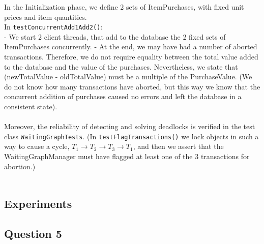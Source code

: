 \documentclass[paper=a4, fontsize=11pt]{scrartcl} %
\numberwithin{equation}{section} %
\numberwithin{figure}{section} %
\numberwithin{table}{section} %
\begin{document}
In the Initialization phase, we define 2 sets of ItemPurchases, with fixed unit prices and item quantities.\\
In \verb|testConcurrentAdd1Add2()|:\\
 - We start 2 client threads, that add to the database the 2 fixed sets of ItemPurchases concurrently.
 - At the end, we may have had a number of aborted transactions. Therefore, we do not require equality between the total value  added to the database and the value of the purchases. Nevertheless, we state that (newTotalValue - oldTotalValue) must be a multiple of the PurchaseValue. (We do not know how many transactions have aborted, but this way we know that the concurrent addition of purchases caused no errors and left the database in a consistent state).\\
~\\
Moreover, the reliability of detecting and solving deadlocks is verified in the test class \verb|WaitingGraphTests|. (In \verb|testFlagTransactions()| we lock objects in such a way to cause a cycle, $T_1 \rightarrow T_2 \rightarrow T_3 \rightarrow T_1  $, and then we assert that the WaitingGraphManager must have flagged at least one of the 3 transactions for abortion.)\\
~\\

\subsection{Experiments}

\subsection{Question 5}
\end{document}
